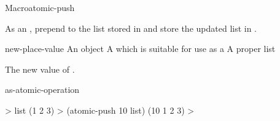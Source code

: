 \documentclass[10pt,twoside,english,pdftex]{article}
\begin{document}
\begin{functiondoc}{Macro}{atomic-push}{ 
    }
%

\fnsyntax

\fnpurpose As an , prepend  to the
list stored in  and store the updated list in
.

\fnpackage {}

\fnmodule {}

\fnargs
\begin{args}{new-place-value}
\arg[item] An object
\arg[place] A  which is suitable for use as a
 A proper list
\end{args}

\fnreturns The new value of . 

\begin{alsos}{as-atomic-operation}
\end{alsos}

\fnexample
%
\W\supp
\begin{example}
  > list
  (1 2 3)
  > (atomic-push 10 list)
  (10 1 2 3)
  >
\end{example}

\end{functiondoc}

\end{document}
